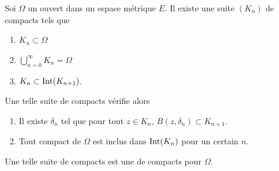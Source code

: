\begin{lemmaDef}       \label{LemGDeZlOo}
    Soi \( \Omega\) un ouvert dans un espace métrique \( E\). Il existe une suite \( (K_n)\) de compacts tels que
    \begin{enumerate}
        \item
            \( K_n\subset \Omega\)
        \item
            \( \bigcup_{n=0}^{\infty}K_n=\Omega\)
        \item
            \( K_n\subset\operatorname{Int}(K_{n+1})\).
    \end{enumerate}
    Une telle suite de compacts vérifie alors
    \begin{enumerate}
        \item
            Il existe \( \delta_n\) tel que pour tout \( z\in K_n\), \( B(z,\delta_n)\subset K_{n+1}\).
        \item
            Tout compact de \( \Omega\) est inclus dans \( \operatorname{Int}(K_n)\) pour un certain \( n\).
    \end{enumerate}
    Une telle suite de compacts est une  de compacts pour \( \Omega\).
\end{lemmaDef}


